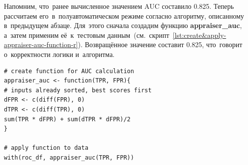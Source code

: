 \documentclass[]{scrreprt}
\begin{document}
Напомним, что~ранее вычисленное значением AUC составило 0.825. Теперь рассчитаем его~в~полуавтоматическом режиме согласно алгоритму, описанному в~предыдущем абзаце. Для~этого сначала создадим функцию \textbf{appraiser\_auc}, а~затем применим её~к~тестовым данным~(см.~скрипт~\ref{lst:create&apply-appraiser-auc-function-r}). Возвращённое значение составит 0.825, что~говорит о~корректности логики и~алгоритма.
%
\begin{lstlisting}[float, caption = Создание функции для~вычисления AUC в~полуавтоматическом режиме и~её~применение к~тестовым данным, firstnumber=1, label= lst:create&apply-appraiser-auc-function-r]
# create function for AUC calculation
appraiser_auc <- function(TPR, FPR){
# inputs already sorted, best scores first 
dFPR <- c(diff(FPR), 0)
dTPR <- c(diff(TPR), 0)
sum(TPR * dFPR) + sum(dTPR * dFPR)/2
}

# apply function to data
with(roc_df, appraiser_auc(TPR, FPR))
\end{lstlisting}
%
\end{document}
